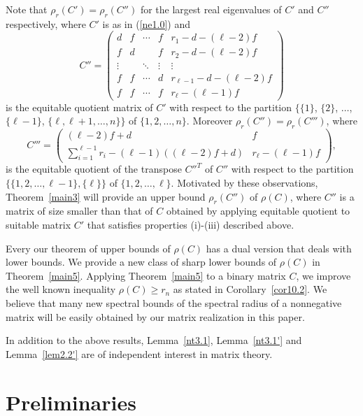 \documentclass[final,3p, times, 12pt]{elsarticle}
\theoremstyle{plain}
\theoremstyle{definition}
\theoremstyle{remark}
\numberwithin{equation}{section}
\begin{document}
 Note that $\rho_r(C')=\rho_r(C'')$ for the largest real eigenvalues of $C'$ and $C''$ respectively, where  $C'$ is as in (\ref{ne1.0}) and
\begin{equation}\label{ne1.2}C''=\left(\begin{array}{cccc|c}
d     &f&\cdots&f     &r_1-d-(\ell-2)f\\
f     &d&      &f     &r_2-d-(\ell-2)f\\
\vdots& &\ddots&\vdots &\vdots \\
f     &f&\cdots&d        &r_{\ell-1}-d-(\ell-2)f\\ \hline
f     &f&\cdots&f     &r_{\ell}-(\ell-1)f
\end{array}\right)
\end{equation}
 is the equitable quotient matrix of $C'$ with respect to the partition $\{\{1\}$, $\{2\}$, $\ldots$, $\{\ell-1\}$, $\{\ell, \ell+1, \ldots, n\}\}$ of $\{1, 2, \ldots, n\}$.
 Moreover  $\rho_r(C'')=\rho_r(C''')$, where
\begin{equation}\label{n31.3}C'''=\begin{pmatrix}(\ell-2)f+d & f\\
\sum_{i=1}^{\ell-1} r_i-(\ell-1)((\ell-2)f+d)    & r_\ell-(\ell-1)f
\end{pmatrix},\end{equation}
is the equitable quotient of the transpose $C''^T$ of $C''$ with respect to the partition $\{\{1, 2, \ldots, \ell-1\}, \{\ell\}\}$ of $\{1, 2, \ldots, \ell\}$.
Motivated by these observations, Theorem~\ref{main3} will provide an upper bound $\rho_r(C'')$ of $\rho(C)$, where $C''$ is a matrix of size smaller than that of $C$ obtained by applying equitable quotient to suitable matrix $C'$  that satisfies properties (i)-(iii) described above.



Every our theorem of upper bounds of $\rho(C)$ has a dual version that deals with lower bounds. We provide a new class of sharp lower bounds of $\rho(C)$  in Theorem~\ref{main5}. Applying  Theorem~\ref{main5} to a binary matrix $C$, we improve the well known inequality  $\rho(C)\geq r_n$ as stated in Corollary~\ref{cor10.2}.
We believe that many new spectral bounds of the spectral radius of a nonnegative matrix will be easily obtained by our matrix realization in this paper.

In addition to the above results, Lemma~\ref{nt3.1}, Lemma~\ref{nt3.1'} and Lemma~\ref{lem2.2'} are of independent interest in matrix theory.

\section{Preliminaries}\label{s1.5}
\end{document}
